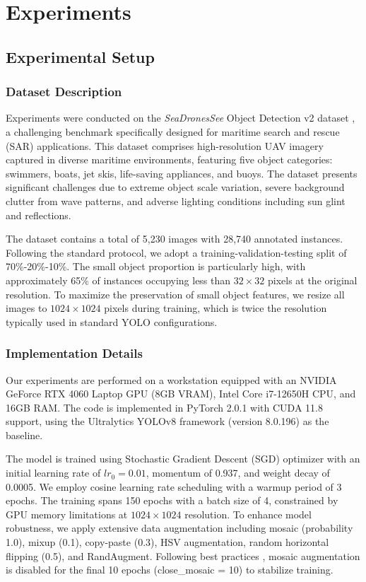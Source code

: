 \documentclass[lettersize,journal]{IEEEtran}
\begin{document}
\section{Experiments}
\label{sec:experiments}

\subsection{Experimental Setup}

\subsubsection{Dataset Description}
Experiments were conducted on the \textit{SeaDronesSee} Object Detection v2 dataset \cite{b2}, a challenging benchmark specifically designed for maritime search and rescue (SAR) applications. This dataset comprises high-resolution UAV imagery captured in diverse maritime environments, featuring five object categories: swimmers, boats, jet skis, life-saving appliances, and buoys. The dataset presents significant challenges due to extreme object scale variation, severe background clutter from wave patterns, and adverse lighting conditions including sun glint and reflections.

The dataset contains a total of 5,230 images with 28,740 annotated instances. Following the standard protocol, we adopt a training-validation-testing split of 70\%-20\%-10\%. The small object proportion is particularly high, with approximately 65\% of instances occupying less than $32 \times 32$ pixels at the original resolution. To maximize the preservation of small object features, we resize all images to $1024 \times 1024$ pixels during training, which is twice the resolution typically used in standard YOLO configurations.

\subsubsection{Implementation Details}
Our experiments are performed on a workstation equipped with an NVIDIA GeForce RTX 4060 Laptop GPU (8GB VRAM), Intel Core i7-12650H CPU, and 16GB RAM. The code is implemented in PyTorch 2.0.1 with CUDA 11.8 support, using the Ultralytics YOLOv8 framework (version 8.0.196) as the baseline.

The model is trained using Stochastic Gradient Descent (SGD) optimizer with an initial learning rate of $lr_0 = 0.01$, momentum of 0.937, and weight decay of 0.0005. We employ cosine learning rate scheduling with a warmup period of 3 epochs. The training spans 150 epochs with a batch size of 4, constrained by GPU memory limitations at $1024 \times 1024$ resolution. To enhance model robustness, we apply extensive data augmentation including mosaic (probability 1.0), mixup (0.1), copy-paste (0.3), HSV augmentation, random horizontal flipping (0.5), and RandAugment. Following best practices \cite{ref10}, mosaic augmentation is disabled for the final 10 epochs (close\_mosaic = 10) to stabilize training.
\end{document}
